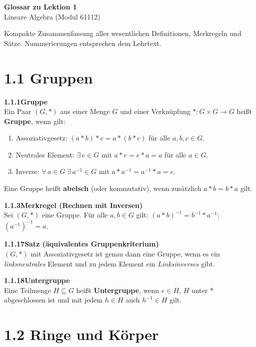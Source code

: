 \documentclass[a4paper,12pt]{article}
\newcommand{\gentry}[3]{%
  \noindent\textbf{#1\quad #2}\nopagebreak\\[0.2em]
  #3\par\smallskip
}
\begin{document}
\begin{center}
  {\LARGE\bfseries Glossar zu Lektion 1}\\[0.5em]
  {\large Lineare Algebra (Modul 61112)}
\end{center}

\vspace{0.8em}
Kompakte Zusammenfassung aller wesentlichen Definitionen, Merkregeln und Sätze. Nummerierungen entsprechen dem Lehrtext.

\section*{1.1 \quad Gruppen}

\gentry{1.1.1}{Gruppe}{%
  Ein Paar $(G, *)$ aus einer Menge $G$ und einer Verknüpfung $* : G \times G \to G$ heißt \textbf{Gruppe}, wenn gilt:
  \begin{enumerate}[label=(G\arabic*), topsep=2pt, itemsep=1pt]
    \item Assoziativgesetz: $(a * b) * c = a * (b * c)$ für alle $a,b,c \in G$.
    \item Neutrales Element: $\exists\, e \in G$ mit $a * e = e * a = a$ für alle $a \in G$.
    \item Inverse: $\forall\, a \in G\; \exists\, a^{-1} \in G$ mit $a * a^{-1} = a^{-1} * a = e$.
  \end{enumerate}
  Eine Gruppe heißt \textbf{abelsch} (oder kommutativ), wenn zusätzlich $a*b = b*a$ gilt.
}

\gentry{1.1.3}{Merkregel (Rechnen mit Inversen)}{%
  Sei $(G,*)$ eine Gruppe. Für alle $a, b \in G$ gilt:
  $(a*b)^{-1} = b^{-1} * a^{-1}$; \quad $(a^{-1})^{-1} = a$.
}

\gentry{1.1.17}{Satz (äquivalentes Gruppenkriterium)}{%
  $(G,*)$ mit Assoziativgesetz ist genau dann eine Gruppe, wenn es ein \emph{linksneutrales} Element und zu jedem Element ein \emph{Linksinverses} gibt.
}

\gentry{1.1.18}{Untergruppe}{%
  Eine Teilmenge $H \subseteq G$ heißt \textbf{Untergruppe}, wenn $e \in H$, $H$ unter $*$ abgeschlossen ist und mit jedem $h \in H$ auch $h^{-1} \in H$ gilt.
}

\section*{1.2 \quad Ringe und Körper}
\end{document}
